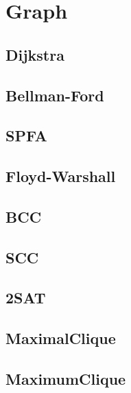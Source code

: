 \section{Graph}

\subsection{Dijkstra}


\subsection{Bellman-Ford}


\subsection{SPFA}


\subsection{Floyd-Warshall}


\subsection{BCC}


\subsection{SCC}


\subsection{2SAT}


\subsection{MaximalClique}


\subsection{MaximumClique}


